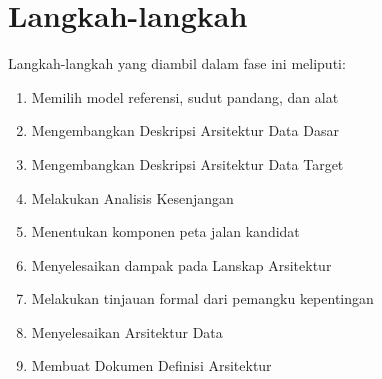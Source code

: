 \section{Langkah-langkah}
Langkah-langkah yang diambil dalam fase ini meliputi:
\begin{enumerate}
	\item Memilih model referensi, sudut pandang, dan alat
	\item Mengembangkan Deskripsi Arsitektur Data Dasar
	\item Mengembangkan Deskripsi Arsitektur Data Target
	\item Melakukan Analisis Kesenjangan
	\item Menentukan komponen peta jalan kandidat
	\item Menyelesaikan dampak pada Lanskap Arsitektur
	\item Melakukan tinjauan formal dari pemangku kepentingan
	\item Menyelesaikan Arsitektur Data
	\item Membuat Dokumen Definisi Arsitektur
\end{enumerate}

